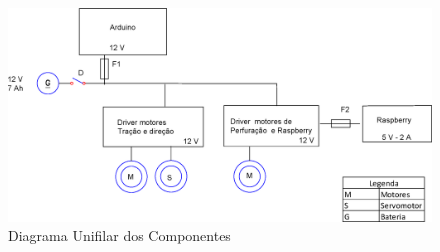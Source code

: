 \begin{itemize}
     \begin{figure}[!htbp]
     \begin{center}
     \includegraphics[keepaspectratio=true,scale=0.5]{figuras/diagramaunifilar.eps}
     \caption{\label{diagramaunifilar}Diagrama Unifilar dos Componentes}
     \end{center}
     \end{figure}

  \end{itemize}
